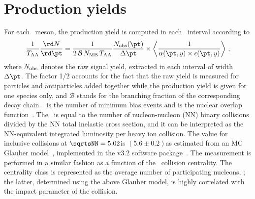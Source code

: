 \documentclass[11pt,twoside,a4paper,cmspaper]{cms-tdr}
\begin{document}
\section{Production yields}

For each \PB\ meson, the production yield is computed in each \pt\ interval according to
%
\begin{equation}
 \frac{1}{\TAA} \frac{{\rd}N}{{\rd}\pt} =  \frac{1}{2 \, \mathcal{B} \, N_{\text{MB}} \, \TAA}
 \frac{N_{\rm{obs}}(\pt)}{\Delta\pt} 
 \times
\left< \frac{1}{\alpha(\pt, y) \times \epsilon(\pt, y)} \right> \, ,
 \label{eq:xsection}
\end{equation}
%
where $N_{\rm{obs}}$ denotes the raw signal yield, extracted in each \pt interval of width $\Delta \pt$.
%
The factor 1/2 accounts for the fact that the raw yield is measured for particles and antiparticles added together while the production yield is given for one species only, and $\mathcal{B}$ stands for the branching fraction of the corresponding decay chain.
%
\NMB\ is the number of minimum bias events and \TAA is the nuclear overlap function~\cite{glauber2007}. 
The \TAA\ is equal to the number of nucleon-nucleon (NN) binary collisions divided by the NN total inelastic cross section, and it can be interpreted as the NN-equivalent integrated luminosity per heavy ion collision. The \TAA value for inclusive \PbPb collisions at $\sqrtsNN=5.02$\TeV is $(5.6\pm0.2)$\mbinv as estimated from an MC Glauber model~\cite{glauber2007}, implemented in the {} v3.2 software package~\cite{glauber2017}.
The measurement is performed in a similar fashion as a function of the \PbPb\ collision centrality. The centrality class is represented as the average number of participating nucleons, \npart; the latter, determined using the above Glauber model, is highly correlated with the impact parameter of the collision.
\end{document}

